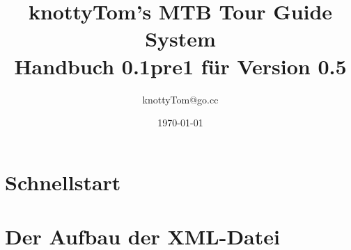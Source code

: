 \documentclass[a4paper,10pt,titlepage]{article}
\title{knottyTom's MTB Tour Guide System\\Handbuch 0.1pre1 f\"ur Version 0.5}
\author{knottyTom@go.cc}
\date{\today}
\begin{document}
\pagestyle{headings}
\setlength{\parskip}{5pt}
\setlength{\parindent}{0pt}

\maketitle
\newpage

\tableofcontents
\newpage



\newpage


\newpage


\newpage
\section{Schnellstart}

\newpage


\newpage
\section{Der Aufbau der  XML-Datei}\label{sec:xml-structure} 

\end{document}
